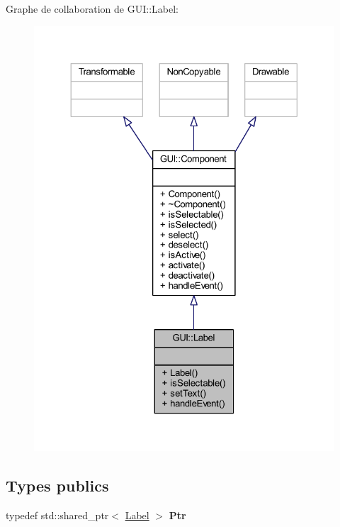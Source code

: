 Graphe de collaboration de G\+UI\+:\+:Label\+:\nopagebreak
\begin{figure}[H]
\begin{center}
\leavevmode
\includegraphics[width=324pt]{class_g_u_i_1_1_label__coll__graph}
\end{center}
\end{figure}
\subsection*{Types publics}
\begin{DoxyCompactItemize}
\item 
\hypertarget{class_g_u_i_1_1_label_aa00f786f8578a677ef7b979aa28c2546}{}\label{class_g_u_i_1_1_label_aa00f786f8578a677ef7b979aa28c2546} 
typedef std\+::shared\+\_\+ptr$<$ \hyperlink{class_g_u_i_1_1_label}{Label} $>$ {\bfseries Ptr}
\end{DoxyCompactItemize}
